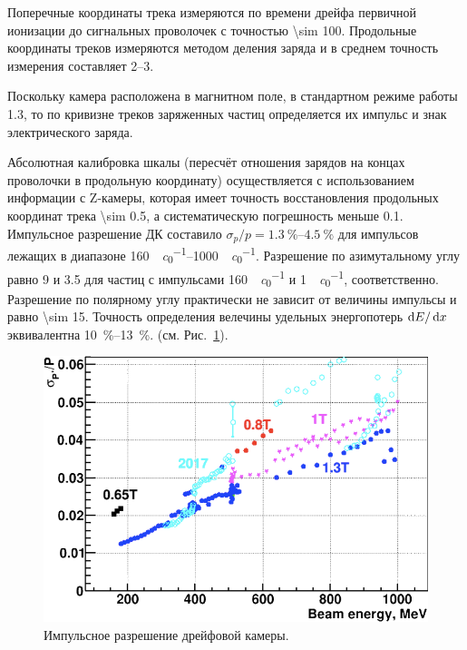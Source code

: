 Поперечные координаты трека измеряются по времени дрейфа первичной ионизации до сигнальных проволочек с точностью \SI{\sim 100}{\umr}.
Продольные координаты треков измеряются методом деления заряда и в среднем точность измерения составляет \SIrange{2}{3}{\mmr}. 

Поскольку камера расположена в магнитном поле,
в стандартном режиме работы \SI{1.3}{\teslaru},
то по кривизне треков заряженных частиц определяется их импульс и знак электрического заряда.

Абсолютная калибровка шкалы (пересчёт отношения зарядов на концах проволочки в продольную координату) осуществляется с использованием информации с Z-камеры,
которая имеет точность восстановления продольных координат трека \SI{\sim 0.5}{\mmr},
а систематическую погрешность меньше \SI{0.1}{\mmr}.
Импульсное разрешение ДК составило
$\sigma_p / p = \SIrange{1.3}{4.5}{\percent}$
для импульсов лежащих в диапазоне
\SIrange{160}{1000}{\MeVr \per \clight}.
Разрешение по азимутальному углу равно \SI{9}{\mradianru} и \SI{3.5}{\mradianru}
для частиц с импульсами \SI{160}{\MeVr \per \clight} и \SI{1}{\GeVr \per \clight},
соответственно.
Разрешение по полярному углу практически не зависит от величины импульсы
и равно \SI{\sim 15}{\mradianru}.
Точность определения велечины удельных энергопотерь $\dif E / \dif x$
эквивалентна \SIrange{10}{13}{\percent}.
(см. Рис.~\ref{fig:dc_mom_res}).

\begin{figure}
    \centering
    \includegraphics[height=.5\textwidth]{img/cmd3_detector/dc_mom_res.png}
    \caption{Импульсное разрешение дрейфовой камеры.}
    \label{fig:dc_mom_res}
\end{figure}



